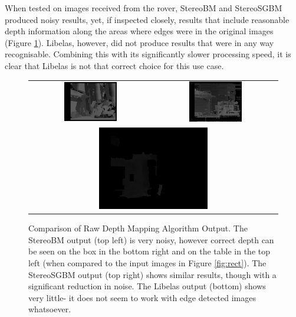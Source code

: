 When tested on images received from the rover, StereoBM and StereoSGBM produced noisy results, yet, if inspected closely, results that include reasonable depth information along the areas where edges were in the original images (Figure \ref{fig:MappingComp}). Libelas, however, did not produce results that were in any way recognisable. Combining this with its significantly slower processing speed, it is clear that Libelas is not that correct choice for this use case.

\begin{figure}[H]
    \begin{center}
    \begin{tabular}{ c c }
        \includegraphics[width=0.45\textwidth]{Figures/BMout.jpg} &
        \includegraphics[width=0.45\textwidth]{Figures/sgbmout.jpg} \\
        \multicolumn{2}{c}{\includegraphics[width=0.45\textwidth]{Figures/libelasout.jpg}}
    \end{tabular}
    \caption[Comparison of Raw Depth Mapping Algorithm Output]{Comparison of Raw Depth Mapping Algorithm Output. The StereoBM output (top left) is very noisy, however correct depth can be seen on the box in the bottom right and on the table in the top left (when compared to the input images in Figure \ref{fig:rect}). The StereoSGBM output (top right) shows similar results, though with a significant reduction in noise. The Libelas output (bottom) shows very little- it does not seem to work with edge detected images whatsoever.}
    \label{fig:MappingComp}
    \end{center}
\end{figure}

